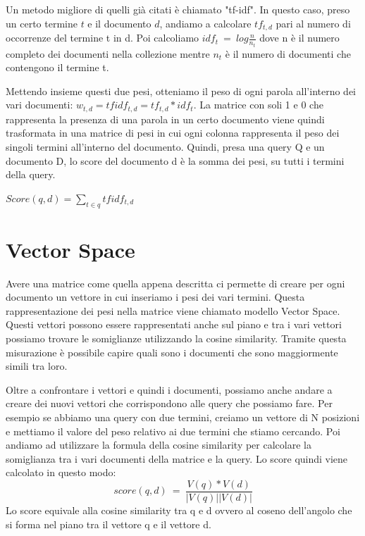 \documentclass[14pt]{extreport}
\begin{document}
Un metodo migliore di quelli già citati è chiamato "tf-idf".
In questo caso, preso un certo termine $t$ e il documento $d$, andiamo a calcolare $tf_{t,d}$ pari al numero di occorrenze del termine t in d.
Poi calcoliamo $idf_t\ =\ log\frac{n}{n_t}$ dove n è il numero completo dei documenti nella collezione mentre $n_t$ è il numero di documenti che contengono il termine t.

Mettendo insieme questi due pesi, otteniamo il peso di ogni parola all'interno dei vari documenti:
$w_{t,d}=tf idf_{t,d} = tf_{t,d} * idf_t$.
La matrice con soli 1 e 0 che rappresenta la presenza di una parola in un certo documento viene quindi trasformata in una matrice di pesi in cui ogni colonna rappresenta il peso dei singoli termini all'interno del documento.
Quindi, presa una query Q e un documento D, lo score del documento d è la somma dei pesi, su tutti i termini della query.

$Score(q,d) = \sum\limits_{t \in q} tfidf_{t,d}$

\section{Vector Space}

Avere una matrice come quella appena descritta ci permette di creare per ogni documento un vettore in cui inseriamo i pesi dei vari termini. Questa rappresentazione dei pesi nella matrice viene chiamato modello Vector Space.
Questi vettori possono essere rappresentati anche sul piano e tra i vari vettori possiamo trovare le somiglianze utilizzando la cosine similarity. Tramite questa misurazione è possibile capire quali sono i documenti che sono maggiormente simili tra loro.

Oltre a confrontare i vettori e quindi i documenti, possiamo anche andare a creare dei nuovi vettori che corrispondono alle query che possiamo fare. Per esempio se abbiamo una query con due termini, creiamo un vettore di N posizioni e mettiamo il valore del peso relativo ai due termini che stiamo cercando. Poi andiamo ad utilizzare la formula della cosine similarity per calcolare la somiglianza tra i vari documenti della matrice e la query.
Lo score quindi viene calcolato in questo modo:
\begin{equation}
    score(q,d)\ =\ \frac{V(q)*V(d)}{|V(q)||V(d)|}
\end{equation}
Lo score equivale alla cosine similarity tra q e d ovvero al coseno dell'angolo che si forma nel piano tra il vettore q e il vettore d.
\end{document}
